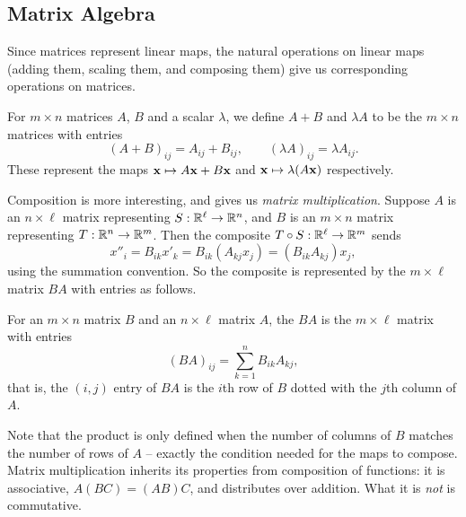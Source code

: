 \documentclass[a4paper]{scrartcl}
\begin{document}
\subsection{Matrix Algebra}

Since matrices represent linear maps, the natural operations on linear maps (adding them, scaling them, and composing them) give us corresponding operations on matrices.

\begin{definition}
	For $m \times n$ matrices $A$, $B$ and a scalar $\lambda$, we define $A + B$ and $\lambda A$ to be the $m \times n$ matrices with entries
	$$
	(A + B)_{ij} = A_{ij} + B_{ij}, \quad \quad (\lambda A)_{ij} = \lambda A_{ij}.
	$$
	These represent the maps $\mathbf{x} \mapsto A\mathbf{x} + B \mathbf{x}$ and $\mathbf{x} \mapsto \lambda (A\mathbf{x})$ respectively.
\end{definition}

Composition is more interesting, and gives us \emph{matrix multiplication}. Suppose $A$ is an $n \times \ell$ matrix representing $S : \mathbb{R}^\ell \rightarrow \mathbb{R}^n$, and $B$ is an $m \times n$ matrix representing $T: \mathbb{R}^n \rightarrow \mathbb{R}^m$. Then the composite $T \circ S : \mathbb{R}^\ell \rightarrow \mathbb{R}^m$ sends
$$
x''_i = B_{ik} x'_k = B_{ik}(A_{kj} x_j) = (B_{ik}A_{kj})x_j,
$$
using the summation convention. So the composite is represented by the $m \times \ell$ matrix $BA$ with entries as follows.

\begin{definition}
	For an $m \times n$ matrix $B$ and an $n \times \ell$ matrix $A$, the  $BA$ is the $m \times \ell$ matrix with entries
	$$
	(BA)_{ij} = \sum_{k = 1}^{n} B_{ik}A_{kj},
	$$
	that is, the $(i, j)$ entry of $BA$ is the $i$th row of $B$ dotted with the $j$th column of $A$.
\end{definition}

Note that the product is only defined when the number of columns of $B$ matches the number of rows of $A$ -- exactly the condition needed for the maps to compose. Matrix multiplication inherits its properties from composition of functions: it is associative, $A(BC) = (AB)C$, and distributes over addition. What it is \emph{not} is commutative.
\end{document}
